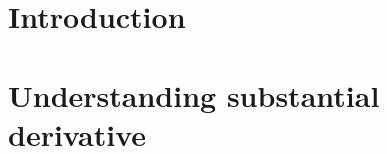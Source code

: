 \documentclass[12pt]{article}
\begin{document}

\setlength{\parindent}{0cm}

\clearpage


\tableofcontents



\setlength{\parskip}{1em}
\renewcommand{\baselinestretch}{1.0}


\newpage


\section{Introduction} \label{chap:intro}








\section{Understanding substantial derivative} \label{chap:deriv}








\newpage

\begin{thebibliography}{50}



\end{thebibliography}
\end{document}

